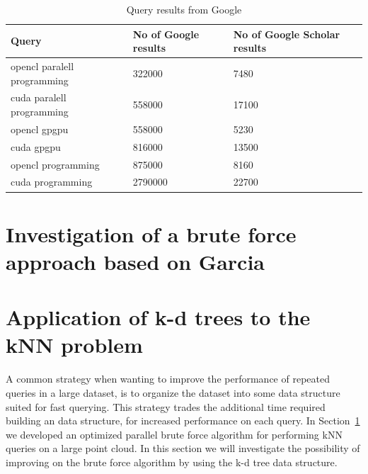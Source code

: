 \begin{table}[ht]
\centering
    \begin{tabular}{ | l | l | l |}
    \hline
    \textbf{Query} & \textbf{No of Google results} & \textbf{No of Google Scholar results} \\ \hline
    opencl paralell programming & 322000    & 7480        \\ \hline
    cuda paralell programming   & 558000    & 17100        \\ \hline
    opencl gpgpu                & 558000    & 5230        \\ \hline
    cuda gpgpu                  & 816000    & 13500        \\ \hline
    opencl programming          & 875000    & 8160        \\ \hline
    cuda programming            & 2790000   & 22700        \\ \hline
    \end{tabular}
    \caption{Query results from Google}
    \label{fig:google-terms-results}
\end{table}


\section{Investigation of a brute force approach based on Garcia} %
\label{sub:investigation_of_a_brute_force_approach_based_on_garcia}




\section{Application of k-d trees to the kNN problem} %
\label{sub:application_of_kd_trees_to_the_knn_problem}

A common strategy when wanting to improve the performance of repeated queries in a large dataset, is to organize the dataset into some data structure suited for fast querying. This strategy trades the additional time required building an data structure, for increased performance on each query. In Section~\ref{sub:investigation_of_a_brute_force_approach_based_on_garcia} we developed an optimized parallel brute force algorithm for performing kNN queries on a large point cloud. In this section we will investigate the possibility of improving on the brute force algorithm by using the k-d tree data structure.

